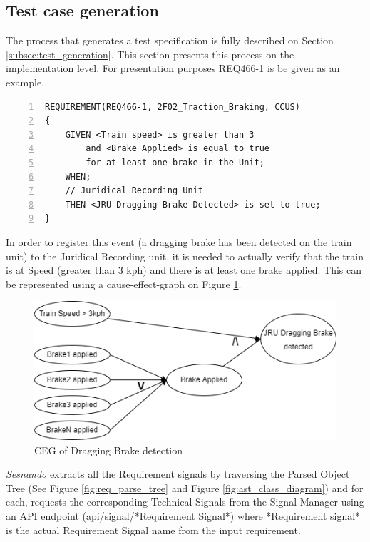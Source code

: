 \subsection{Test case generation}
\label{subsec:def_test_case_gen}

The process that generates a test specification is fully described on Section \ref{subsec:test_generation}. This section presents this process on the implementation level. For presentation purposes REQ466-1 is be given as an example.\\

\begin{Verbatim}[xleftmargin=12mm, numbers=left]
REQUIREMENT(REQ466-1, 2F02_Traction_Braking, CCUS)
{
	GIVEN <Train speed> is greater than 3
	    and <Brake Applied> is equal to true 
	    for at least one brake in the Unit;
	WHEN;
	// Juridical Recording Unit
	THEN <JRU Dragging Brake Detected> is set to true;
}
\end{Verbatim}

In order to register this event (a dragging brake has been detected on the train unit) to the Juridical Recording unit, it is needed to actually verify that the train is at Speed (greater than 3 kph) and there is at least one brake applied. This can be represented using a cause-effect-graph \cite{nursimulu_cause-effect_1995} on Figure \ref{fig:ceg_dbd}.

\begin{figure}[h]
    \centering
    \includegraphics[width=\textwidth]{images/ceg_dbd.png}
    \caption{CEG of Dragging Brake detection}
    \label{fig:ceg_dbd}
\end{figure}


\textit{Sesnando} extracts all the Requirement signals by traversing the Parsed Object Tree (See Figure \ref{fig:req_parse_tree} and Figure \ref{fig:ast_class_diagram}) and for each, requests the corresponding Technical Signals from the Signal Manager using an API endpoint (api/signal/*Requirement Signal*) where *Requirement signal* is the actual Requirement Signal name from the input requirement.\\

